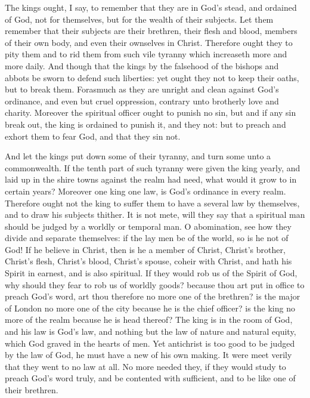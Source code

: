 The kings ought, I say, to remember that they are in 
God's stead, and ordained of God, not for themselves, but 
for the wealth of their subjects. Let them remember that 
their subjects are their brethren, their flesh and blood, 
members of their own body, and even their ownselves in 
Christ. Therefore ought they to pity them and to rid 
them from such vile tyranny which increaseth more and 
more daily. And though that the kings by the falsehood
of the bishops and abbots be sworn to defend such liberties:
yet ought they not to keep their oaths, but to 
break them. Forasmuch as they are unright and clean 
against God's ordinance, and even but cruel oppression, 
contrary unto brotherly love and charity. Moreover the 
spiritual officer ought to punish no sin, but and if any sin 
break out, the king is ordained to punish it, and they not: 
but to preach and exhort them to fear God, and that they 
sin not. 

And let the kings put down some of their tyranny, and 
turn some unto a commonwealth. If the tenth part of 
such tyranny were given the king yearly, and laid up in the 
shire towns against the realm had need, what would it grow 
to in certain years? Moreover one king one law, is God's 
ordinance in every realm. Therefore ought not the king to 
suffer them to have a several law by themselves, and to 
draw his subjects thither. It is not mete, will they say 
that a spiritual man should be judged by a worldly or temporal
man. O abomination, see how they divide and separate
themselves: if the lay men be of the world, so is he 
not of God! If he believe in Christ, then is he a member 
of Christ, Christ's brother, Christ's flesh, Christ's blood, 
Christ's spouse, coheir with Christ, and hath his Spirit 
in earnest, and is also spiritual. If they would rob us of 
the Spirit of God, why should they fear to rob us of 
worldly goods? because thou art put in office to preach 
God's word, art thou therefore no more one of the 
brethren? is the major of London no more one of the city 
because he is the chief officer? is the king no more of the 
realm because he is head thereof? The king is in the room 
of God, and his law is God's law, and nothing but the law 
of nature and natural equity, which God graved in the 
hearts of men. Yet antichrist is too good to be judged 
by the law of God, he must have a new of his own making. 
It were meet verily that they went to no law at all. No 
more needed they, if they would study to preach God's word 
truly, and be contented with sufficient, and to be like one 
of their brethren. 

